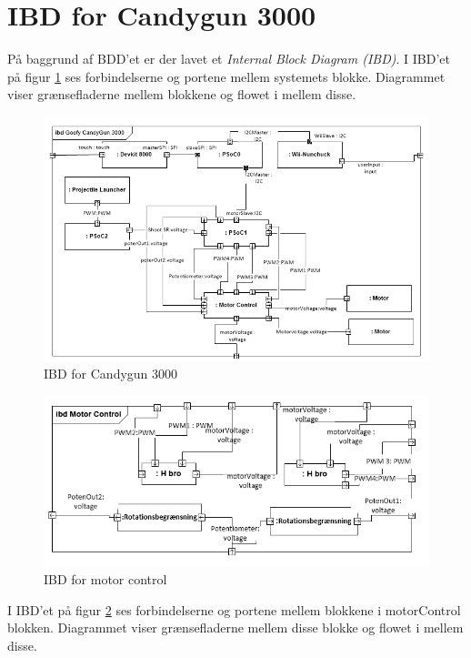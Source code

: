 \section{IBD for Candygun 3000}
På baggrund af BDD'et er der lavet et \textit{Internal Block Diagram (IBD)}. I IBD'et på figur \ref{fig:IBD} ses forbindelserne og portene mellem systemets blokke. Diagrammet viser grænsefladerne mellem blokkene og flowet i mellem disse. 

\begin{figure}[H]
	\centering
	\includegraphics[width=\textwidth]{Systemarkitektur/images/jgjgj}
	\caption{IBD for Candygun 3000}
	\label{fig:IBD}
\end{figure}

\begin{figure}[H]
	\centering
	\includegraphics[width= \textwidth]{Systemarkitektur/images/IBDmotorcontrol2}
	\caption{IBD for motor control}
	\label{fig:IBDm}
\end{figure}
I IBD'et på figur \ref{fig:IBDm} ses forbindelserne og portene mellem blokkene i motorControl blokken. Diagrammet viser grænsefladerne mellem disse blokke og flowet i mellem disse.

